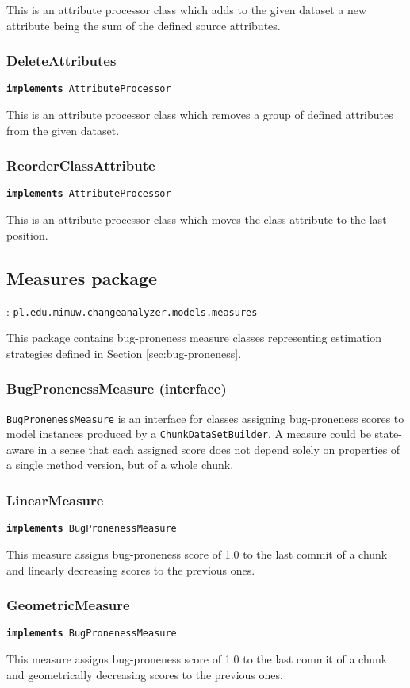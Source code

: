 \documentclass{pracamgr}
\newcommand{\pack}[3]{\subsection{#1 package} \label{sec:#2} \underline{\smash{Full package name}}: \texttt{#3}\medskip}
\newcommand{\implements}[1]{\vspace{-0.5em}\hspace{\parindent}\texttt{\textbf{implements} #1}\vspace{0.5em}}
\begin{document}
\noindent This is an attribute processor class which adds to the given dataset a new attribute being the sum of the defined source attributes.

\subsubsection*{DeleteAttributes}
\implements{AttributeProcessor}

\noindent This is an attribute processor class which removes a group of defined attributes from the given dataset.

\subsubsection*{ReorderClassAttribute}
\implements{AttributeProcessor}

\noindent This is an attribute processor class which moves the class attribute to the last position.

\pack{Measures}{measures}{pl.edu.mimuw.changeanalyzer.models.measures}

\noindent This package contains bug-proneness measure classes representing estimation strategies defined in Section \ref{sec:bug-proneness}.

\subsubsection*{BugPronenessMeasure (interface)}
\texttt{BugPronenessMeasure} is an interface for classes assigning bug-proneness scores to model instances produced by a \texttt{ChunkDataSetBuilder}. A measure could be state-aware in a sense that each assigned score does not depend solely on properties of a single method version, but of a whole chunk.

\subsubsection*{LinearMeasure}
\implements{BugPronenessMeasure}

\noindent This measure assigns bug-proneness score of 1.0 to the last commit of a chunk and linearly decreasing scores to the previous ones.

\subsubsection*{GeometricMeasure}
\implements{BugPronenessMeasure}

\noindent This measure assigns bug-proneness score of 1.0 to the last commit of a chunk and geometrically decreasing scores to the previous ones.
\end{document}
